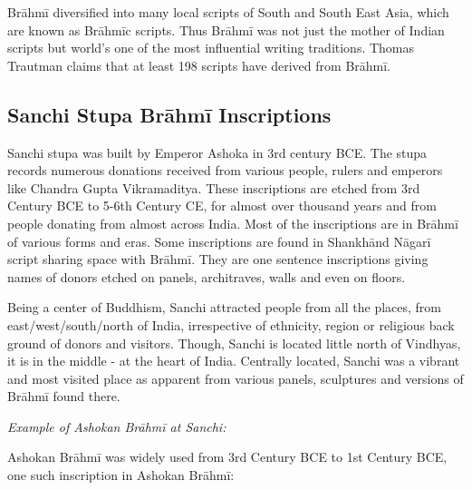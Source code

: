 Brāhmī diversified into many local scripts of South and South East Asia, which are known as Brāhmīc scripts. Thus Brāhmī was not just the mother of Indian scripts but world’s one of the most influential writing traditions. Thomas Trautman claims that at least 198 scripts have derived from Brāhmī.

\subsection*{Sanchi Stupa Brāhmī Inscriptions}

Sanchi stupa was built by Emperor Ashoka in 3rd century BCE. The stupa records numerous donations received from various people, rulers and emperors like Chandra Gupta Vikramaditya. These inscriptions are etched from 3rd Century BCE to 5-6th Century CE, for almost over thousand years and from people donating from almost across India. Most of the inscriptions are in Brāhmī of various forms and eras. Some inscriptions are found in Shankhānd Nāgarī script sharing space with Brāhmī. They are one sentence inscriptions giving names of donors etched on panels, architraves, walls and even on floors. 

Being a center of Buddhism, Sanchi attracted people from all the places, from east/west/south/north of India, irrespective of ethnicity, region or religious back ground of donors and visitors. Though, Sanchi is located little north of Vindhyas, it is in the middle - at the heart of India. Centrally located, Sanchi was a vibrant and most visited place as apparent from various panels, sculptures and versions of Brāhmī found there.

\textit{Example of Ashokan Brāhmī at Sanchi:}

Ashokan Brāhmī was widely used from 3rd Century BCE to 1st Century BCE, one such inscription in Ashokan Brāhmī:

\vskip 2pt

